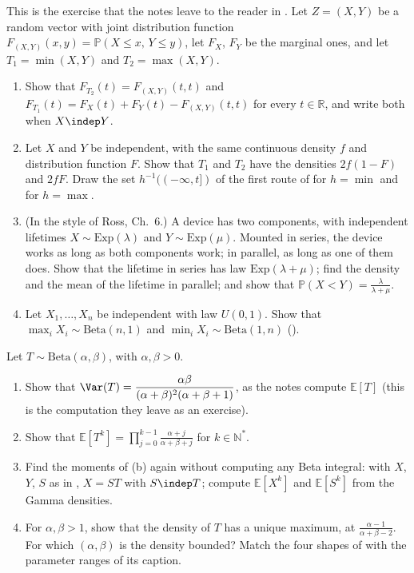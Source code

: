 \begin{exercise}\label{ex:rv-min-max}
\easy This is the exercise that the notes leave to the reader in
. Let $Z=(X,Y)$ be a random vector with joint distribution function
$F_{(X,Y)}(x,y)=\mathbb P(X\le x,\,Y\le y)$, let $F_X$, $F_Y$ be the marginal ones, and let
$T_1=\min(X,Y)$ and $T_2=\max(X,Y)$.
\begin{enumerate}[label=(\alph*)]
  \item Show that $F_{T_2}(t)=F_{(X,Y)}(t,t)$ and $F_{T_1}(t)=F_X(t)+F_Y(t)-F_{(X,Y)}(t,t)$ for every
    $t\in\mathbb R$, and write both when $X\indep Y$.
  \item Let $X$ and $Y$ be independent, with the same continuous density $f$ and distribution function
    $F$. Show that $T_1$ and $T_2$ have the densities $2f(1-F)$ and $2fF$. Draw the set
    $h^{-1}((-\infty,t])$ of the first route of  for $h=\min$ and for
    $h=\max$.
  \item (In the style of Ross, Ch.~6.) A device has two components, with independent lifetimes $X\sim\mathrm{Exp}(\lambda)$ and
    $Y\sim\mathrm{Exp}(\mu)$. Mounted in series, the device works as long as both components work;
    in parallel, as long as one of them does. Show that the lifetime in series has law
    $\mathrm{Exp}(\lambda+\mu)$; find the density and the mean of the lifetime in parallel; and show
    that $\mathbb P(X<Y)=\frac\lambda{\lambda+\mu}$.
  \item Let $X_1,\dots,X_n$ be independent with law $U(0,1)$. Show that $\max_iX_i\sim\mathrm{Beta}(n,1)$
    and $\min_iX_i\sim\mathrm{Beta}(1,n)$ ().
\end{enumerate}
\end{exercise}

\begin{exercise}\label{ex:rv-beta-moments}
\easy Let $T\sim\mathrm{Beta}(\alpha,\beta)$, with $\alpha,\beta>0$.
\begin{enumerate}[label=(\alph*)]
  \item Show that $\Var(T)=\dfrac{\alpha\beta}{(\alpha+\beta)^2(\alpha+\beta+1)}$, as the notes compute
    $\mathbb E[T]$ (this is the computation they leave as an exercise).
  \item Show that $\mathbb E[T^k]=\prod_{j=0}^{k-1}\frac{\alpha+j}{\alpha+\beta+j}$ for $k\in\mathbb N^*$.
  \item Find the moments of (b) again without computing any Beta integral: with $X$, $Y$, $S$ as in
    , $X=ST$ with $S\indep T$; compute $\mathbb E[X^k]$ and
    $\mathbb E[S^k]$ from the Gamma densities.
  \item For $\alpha,\beta>1$, show that the density of $T$ has a unique maximum, at
    $\frac{\alpha-1}{\alpha+\beta-2}$. For which $(\alpha,\beta)$ is the density bounded? Match the four
    shapes of  with the parameter ranges of its caption.
\end{enumerate}
\end{exercise}

